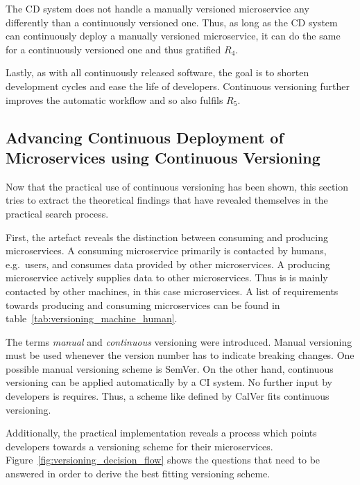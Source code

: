 The \ac{CD} system does not handle a manually versioned microservice any
differently than a continuously versioned one. Thus, as long as the \ac{CD}
system can continuously deploy a manually versioned microservice, it can do the
same for a continuously versioned one and thus gratified $R_4$.

Lastly, as with all continuously released software, the goal is to shorten
development cycles and ease the life of developers. Continuous versioning
further improves the automatic workflow and so also fulfils $R_5$.

\subsection{Advancing Continuous Deployment of Microservices using Continuous Versioning}%
\label{sub:Advancing_Continuous_Deployment_of_Microservices_using_XXX_Versioning}
Now that the practical use of continuous versioning has been shown, this
section tries to extract the theoretical findings that have revealed themselves
in the practical search process.

First, the artefact reveals the distinction between consuming and producing
microservices. A consuming microservice primarily is contacted by humans, e.g.\
users, and consumes data provided by other microservices. A producing
microservice actively supplies data to other microservices. Thus is is mainly
contacted by other machines, in this case microservices. A list of requirements
towards producing and consuming microservices can be found in
table~\ref{tab:versioning_machine_human}.

The terms \textit{manual} and \textit{continuous} versioning were introduced.
Manual versioning must be used whenever the version number has to indicate
breaking changes. One possible manual versioning scheme is SemVer. On the other
hand, continuous versioning can be applied automatically by a \ac{CI} system.
No further input by developers is requires. Thus, a scheme like defined by
CalVer fits continuous versioning.

Additionally, the practical implementation reveals a process which points
developers towards a versioning scheme for their microservices.
Figure~\ref{fig:versioning_decision_flow} shows the questions that need to be
answered in order to derive the best fitting versioning scheme.

